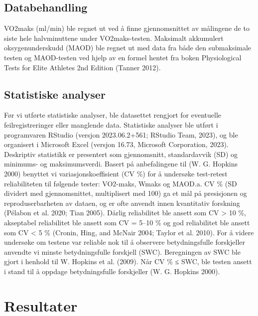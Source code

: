 \documentclass[
  letterpaper,
  DIV=11,
  numbers=noendperiod]{scrreprt}
\begin{document}
\hypertarget{databehandling}{%
\subsection{Databehandling}\label{databehandling}}

VO2maks (ml/min) ble regnet ut ved å finne gjennomsnittet av målingene
de to siste hele halvminuttene under VO2maks-testen. Maksimalt
akkumulert oksygenunderskudd (MAOD) ble regnet ut med data fra både den
submaksimale testen og MAOD-testen ved hjelp av en formel hentet fra
boken Physiological Tests for Elite Athletes 2nd Edition (Tanner 2012).

\hypertarget{statistiske-analyser}{%
\subsection{Statistiske analyser}\label{statistiske-analyser}}

Før vi utførte statistiske analyser, ble datasettet rengjort for
eventuelle feilregistreringer eller manglende data. Statistiske analyser
ble utført i programvaren RStudio (versjon 2023.06.2+561; RStudio Team,
2023), og ble organisert i Microsoft Excel (versjon 16.73, Microsoft
Corporation, 2023). Deskriptiv statistikk er presentert som
gjennomsnitt, standardavvik (SD) og minimums- og maksimumsverdi. Basert
på anbefalingene til (W. G. Hopkins 2000) benyttet vi
variasjonskoeffisient (CV \%) for å undersøke test-retest reliabiliteten
til følgende tester: VO2-maks, Wmaks og MAOD.a. CV \% (SD dividert med
gjennomsnittet, multiplisert med 100) ga et mål på presisjonen og
reproduserbarheten av dataen, og er ofte anvendt innen kvantitativ
forskning (Pélabon et al. 2020; Tian 2005). Dårlig reliabilitet ble
ansett som CV \textgreater{} 10 \%, akseptabel reliabilitet ble ansett
som CV = 5--10 \% og god reliabilitet ble ansett som CV \textless{} 5 \%
(Cronin, Hing, and McNair 2004; Taylor et al. 2010). For å videre
undersøke om testene var reliable nok til å observere betydningsfulle
forskjeller anvendte vi minste betydningsfulle forskjell (SWC).
Beregningen av SWC ble gjort i henhold til W. Hopkins et al. (2009). Når
CV \% ≤ SWC, ble testen ansett i stand til å oppdage betydningsfulle
forskjeller (W. G. Hopkins 2000).

\hypertarget{resultater}{%
\section{Resultater}\label{resultater}}
\end{document}
